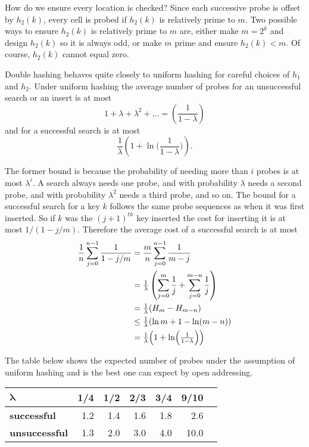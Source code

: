 How do we ensure every location is checked? Since each successive
probe is offset by $h_2(k)$, every cell is probed if $h_2(k)$ is
relatively prime to $m$. Two possible ways to ensure $h_2(k)$
is relatively prime to $m$ are, either make $m=2^k$ and design $h_2(k)$
so it is always odd, or make $m$ prime and ensure $h_2(k) < m$. Of
course, $h_2(k)$ cannot equal zero.

Double hashing behaves quite closely to uniform hashing for
careful choices of $h_1$ and $h_2$. Under uniform hashing the
average number of probes for an unsuccessful search or an insert is at most
\[1 + \lambda + \lambda^2 +... = \left(\frac1{1-\lambda}\right) \]
and for a successful search is at most
\[\frac1{\lambda} \left (1+\ln \biggl(\frac1{1-\lambda}\biggr)\right). \]

The former bound is because the probability of needing more than $i$
probes is at most $\lambda^i$. A search always needs one probe, and with
probability $\lambda$ needs a second probe, and with probability
$\lambda^2$ needs a third probe, and so on.  The bound for a
successful search for a key $k$ follows the same probe sequences as
when it was first inserted. So if $k$ was the $(j+1)^{th}$ key inserted
the cost for inserting it is at most $1/(1-j/m)$.  Therefore
the average cost of a successful search is at most
\begin{align*}
\frac1{n} \sum_{j=0}^{n-1} \frac{1}{1-j/m} &=
\frac{m}{n}\sum_{j=0}^{n-1} \frac{1}{m-j} \\
&=\tfrac1{\lambda}\left(\sum_{j=0}^{m} \frac{1}{j} + \sum_{j=0}^{m-n} \frac{1}{j}\right)\\
&= \tfrac1{\lambda}(H_m - H_{m-n}) \\
&\leq \tfrac1{\lambda}(\ln m + 1 - \ln(m-n)) \\
&= \tfrac1{\lambda}\Bigr(1+\ln \Bigl(\tfrac1{1-\lambda}\Bigr)\Bigr)
\end{align*}


The table below shows the expected number of probes under the
assumption of uniform hashing and is the best one can expect by open
addressing.

\begin{tabular}{l r r r r r r}
\toprule
$\mathbf{\lambda}$    & 1/4 & 1/2 & 2/3 & 3/4 & 9/10 \\ \midrule
\textbf{successful}  & 1.2 & 1.4 & 1.6 & 1.8 & 2.6 \\
\textbf{unsuccessful}& 1.3 & 2.0 & 3.0 & 4.0 & 10.0 \\
\bottomrule
\end{tabular}

